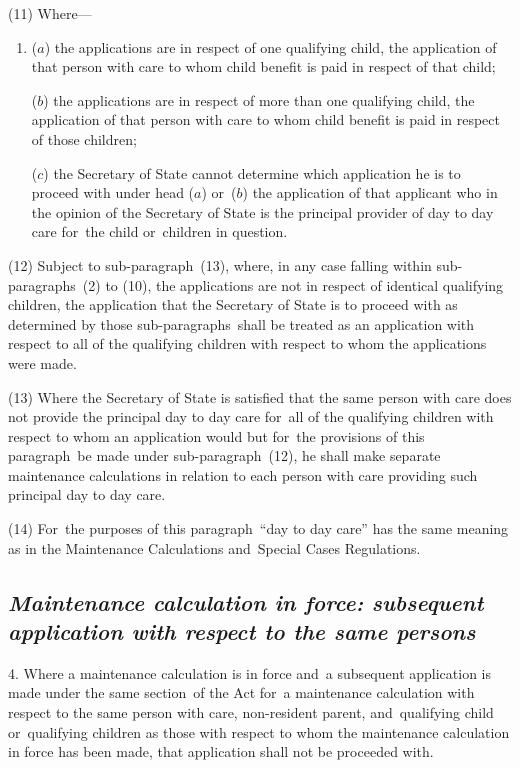 \documentclass[12pt,a4paper]{article}
\begin{document}
(11) Where—
\begin{enumerate}\item[]
($a$) the applications are in respect of one qualifying child, the application of that person with care to whom child benefit is paid in respect of that child;

($b$) the applications are in respect of more than one qualifying child, the application of that person with care to whom child benefit is paid in respect of those children;

($c$) the Secretary of State cannot determine which application he is to proceed with under head ($a$)  or~($b$)  the application of that applicant who in the opinion of the Secretary of State is the principal provider of day to day care for~the child or~children in question.
\end{enumerate}

(12) Subject to sub-paragraph~(13), where, in any case falling within sub-paragraphs~(2) to (10), the applications are not in respect of identical qualifying children, the application that the Secretary of State is to proceed with as determined by those sub-paragraphs~shall be treated as an application with respect to all of the qualifying children with respect to whom the applications were made.

(13) Where the Secretary of State is satisfied that the same person with care does not provide the principal day to day care for~all of the qualifying children with respect to whom an application would but for~the provisions of this paragraph~be made under sub-paragraph~(12), he shall make separate maintenance calculations in relation to each person with care providing such principal day to day care.

(14) For~the purposes of this paragraph~“day to day care” has the same meaning as in the Maintenance Calculations and~Special Cases Regulations.


\subsection*{\itshape Maintenance calculation in force: subsequent application with respect to the same persons}

4.  Where a maintenance calculation is in force and~a subsequent application is made 
under the same section~of the Act for~a maintenance calculation with respect to the same person with care, non-resident parent, and~qualifying child or~qualifying children as those with respect to whom the maintenance calculation in force has been made, that application shall not be proceeded with. 
\end{document}
